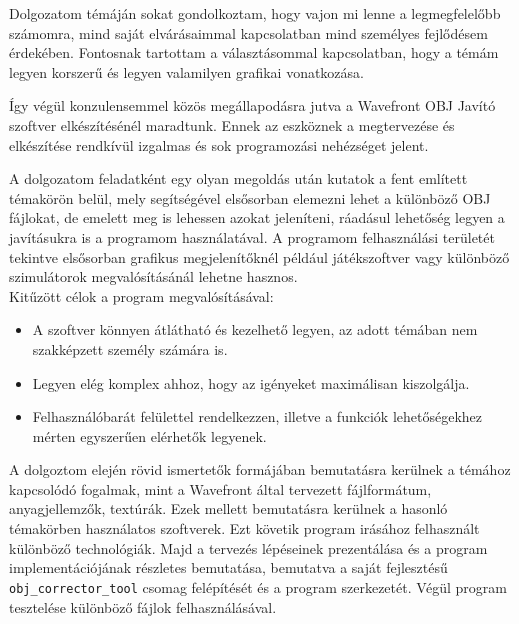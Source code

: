 
Dolgozatom témáján sokat gondolkoztam, hogy vajon mi lenne a legmegfelelőbb számomra, mind saját elvárásaimmal kapcsolatban mind személyes fejlődésem érdekében. Fontosnak tartottam a választásommal kapcsolatban, hogy a témám legyen korszerű és legyen valamilyen grafikai vonatkozása.

Így végül konzulensemmel közös megállapodásra jutva a Wavefront OBJ Javító szoftver elkészítésénél maradtunk. Ennek az eszköznek a megtervezése és elkészítése rendkívül izgalmas és sok programozási nehézséget jelent.

A dolgozatom feladatként egy olyan megoldás után kutatok a fent említett témakörön belül, mely segítségével elsősorban elemezni lehet a különböző OBJ fájlokat, de emelett meg is lehessen azokat jeleníteni, ráadásul lehetőség legyen  a javításukra is a programom használatával. A programom felhasználási területét tekintve elsősorban grafikus megjelenítőknél például játékszoftver  vagy különböző szimulátorok megvalósításánál lehetne hasznos.\\

Kitűzött célok a program megvalósításával:
\begin{itemize}
\item A szoftver könnyen átlátható és kezelhető legyen, az adott témában nem szakképzett
személy számára is.
\item Legyen elég komplex ahhoz, hogy  az igényeket maximálisan kiszolgálja.
\item Felhasználóbarát felülettel rendelkezzen, illetve a funkciók lehetőségekhez mérten egyszerűen elérhetők legyenek.
\end{itemize}

\noindent A dolgoztom elején rövid ismertetők formájában bemutatásra kerülnek a témához kapcsolódó fogalmak, mint a Wavefront által tervezett fájlformátum, anyagjellemzők, textúrák. Ezek mellett bemutatásra kerülnek a hasonló témakörben használatos szoftverek. Ezt követik program irásához felhasznált különböző technológiák. Majd a tervezés lépéseinek prezentálása és a program implementációjának részletes bemutatása, bemutatva a saját fejlesztésű \texttt{obj\_corrector\_tool} csomag felépítését és a program szerkezetét. Végül program tesztelése különböző fájlok felhasználásával.



